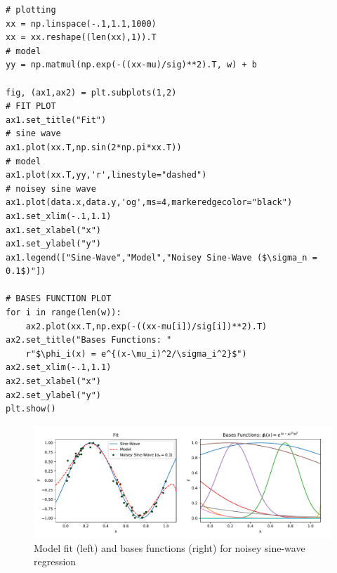 \documentclass[10pt,a4paper]{article}
\begin{document}
\begin{verbatim}
# plotting
xx = np.linspace(-.1,1.1,1000)
xx = xx.reshape((len(xx),1)).T
# model
yy = np.matmul(np.exp(-((xx-mu)/sig)**2).T, w) + b

fig, (ax1,ax2) = plt.subplots(1,2)
# FIT PLOT
ax1.set_title("Fit")
# sine wave
ax1.plot(xx.T,np.sin(2*np.pi*xx.T))
# model
ax1.plot(xx.T,yy,'r',linestyle="dashed")
# noisey sine wave
ax1.plot(data.x,data.y,'og',ms=4,markeredgecolor="black")
ax1.set_xlim(-.1,1.1)
ax1.set_xlabel("x")
ax1.set_ylabel("y")
ax1.legend(["Sine-Wave","Model","Noisey Sine-Wave ($\sigma_n = 0.1$)"])

# BASES FUNCTION PLOT
for i in range(len(w)):
    ax2.plot(xx.T,np.exp(-((xx-mu[i])/sig[i])**2).T)
ax2.set_title("Bases Functions: "
    r"$\phi_i(x) = e^{(x-\mu_i)^2/\sigma_i^2}$")
ax2.set_xlim(-.1,1.1)
ax2.set_xlabel("x")
ax2.set_ylabel("y")
plt.show()
\end{verbatim}

\begin{figure}[h]
\centering
\includegraphics[width=\textwidth]{Figure_M10.pdf}
\caption{Model fit (left) and bases functions (right) for noisey sine-wave regression}
\end{figure}
\end{document}
